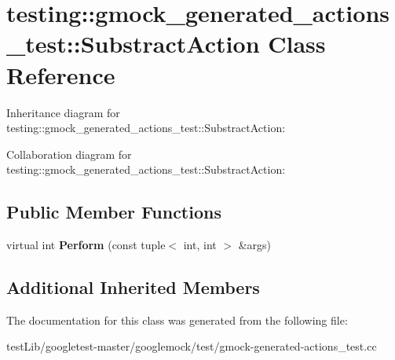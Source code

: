 \hypertarget{classtesting_1_1gmock__generated__actions__test_1_1SubstractAction}{}\section{testing\+:\+:gmock\+\_\+generated\+\_\+actions\+\_\+test\+:\+:Substract\+Action Class Reference}
\label{classtesting_1_1gmock__generated__actions__test_1_1SubstractAction}


Inheritance diagram for testing\+:\+:gmock\+\_\+generated\+\_\+actions\+\_\+test\+:\+:Substract\+Action\+:


Collaboration diagram for testing\+:\+:gmock\+\_\+generated\+\_\+actions\+\_\+test\+:\+:Substract\+Action\+:
\subsection*{Public Member Functions}
\begin{DoxyCompactItemize}
\item 
\mbox{\label{classtesting_1_1gmock__generated__actions__test_1_1SubstractAction_ac049ec6196668e17ef7384e08914f2c3}} 
virtual int {\bfseries Perform} (const tuple$<$ int, int $>$ \&args)
\end{DoxyCompactItemize}
\subsection*{Additional Inherited Members}


The documentation for this class was generated from the following file\+:\begin{DoxyCompactItemize}
\item 
test\+Lib/googletest-\/master/googlemock/test/gmock-\/generated-\/actions\+\_\+test.\+cc\end{DoxyCompactItemize}
